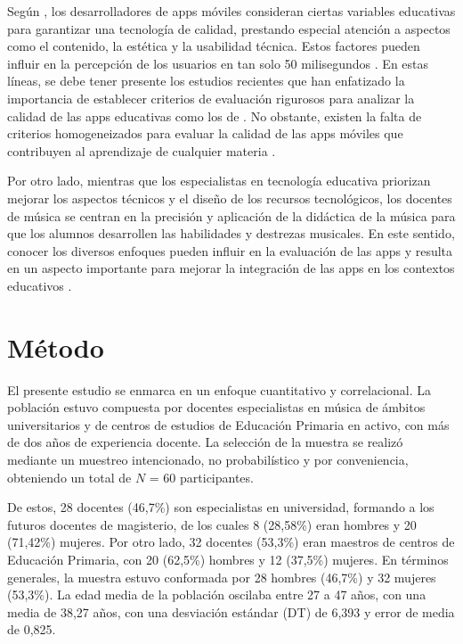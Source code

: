 \documentclass[spanish]{textolivre}
\begin{document}
Según \textcite{gomez2020}, los desarrolladores de apps móviles consideran ciertas variables educativas para garantizar una tecnología de calidad, prestando especial atención a aspectos como el contenido, la estética y la usabilidad técnica. Estos factores pueden influir en la percepción de los usuarios en tan solo 50 milisegundos \cite{joachims2017}. En estas líneas, se debe tener presente los estudios recientes que han enfatizado la importancia de establecer criterios de evaluación rigurosos para analizar la calidad de las apps educativas como los de \textcite{hirsh-pasek2015, merchant2020}. No obstante, existen la falta de criterios homogeneizados para evaluar la calidad de las apps móviles que contribuyen al aprendizaje de cualquier materia \cite{delgado-morales2023, quezada-bolanos2023}.

Por otro lado, mientras que los especialistas en tecnología educativa priorizan mejorar los aspectos técnicos y el diseño de los recursos tecnológicos, los docentes de música se centran en la precisión y aplicación de la didáctica de la música para que los alumnos desarrollen las habilidades y destrezas musicales. En este sentido, conocer los diversos enfoques pueden influir en la evaluación de las apps y resulta en un aspecto importante para mejorar la integración de las apps en los contextos educativos \cite{eusterbrock2023, quezada-bolanos2023}.

\section{Método}\label{sec-2}
El presente estudio se enmarca en un enfoque cuantitativo y correlacional. La población estuvo compuesta por docentes especialistas en música de ámbitos universitarios y de centros de estudios de Educación Primaria en activo, con más de dos años de experiencia docente. La selección de la muestra se realizó mediante un muestreo intencionado, no probabilístico y por conveniencia, obteniendo un total de $N$ = 60 participantes. 

De estos, 28 docentes (46,7\%) son especialistas en universidad, formando a los futuros docentes de magisterio, de los cuales 8 (28,58\%) eran hombres y 20 (71,42\%) mujeres. Por otro lado, 32 docentes (53,3\%) eran maestros de centros de Educación Primaria, con 20 (62,5\%) hombres y 12 (37,5\%) mujeres. En términos generales, la muestra estuvo conformada por 28 hombres (46,7\%) y 32 mujeres (53,3\%). La edad media de la población oscilaba entre 27 a 47 años, con una media de 38,27 años, con una desviación estándar (DT) de 6,393 y error de media de 0,825.
\end{document}

